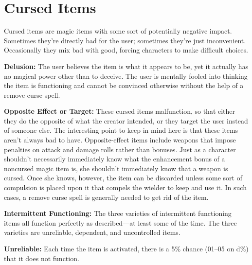 \section{Cursed Items}
Cursed items are magic items with some sort of potentially negative impact. Sometimes they're directly bad for the user; sometimes they're just inconvenient. Occasionally they mix bad with good, forcing characters to make difficult choices.


\textbf{Delusion:} The user believes the item is what it appears to be, yet it actually has no magical power other than to deceive. The user is mentally fooled into thinking the item is functioning and cannot be convinced otherwise without the help of a remove curse spell.

\textbf{Opposite Effect or Target:} These cursed items malfunction, so that either they do the opposite of what the creator intended, or they target the user instead of someone else. The interesting point to keep in mind here is that these items aren't always bad to have. Opposite-effect items include weapons that impose penalties on attack and damage rolls rather than bonuses. Just as a character shouldn't necessarily immediately know what the enhancement bonus of a noncursed magic item is, she shouldn't immediately know that a weapon is cursed. Once she knows, however, the item can be discarded unless some sort of compulsion is placed upon it that compels the wielder to keep and use it. In such cases, a remove curse spell is generally needed to get rid of the item.

\textbf{Intermittent Functioning:} The three varieties of intermittent functioning items all function perfectly as described---at least some of the time. The three varieties are unreliable, dependent, and uncontrolled items.

\textbf{Unreliable:} Each time the item is activated, there is a 5\% chance (01--05 on d\%) that it does not function.

